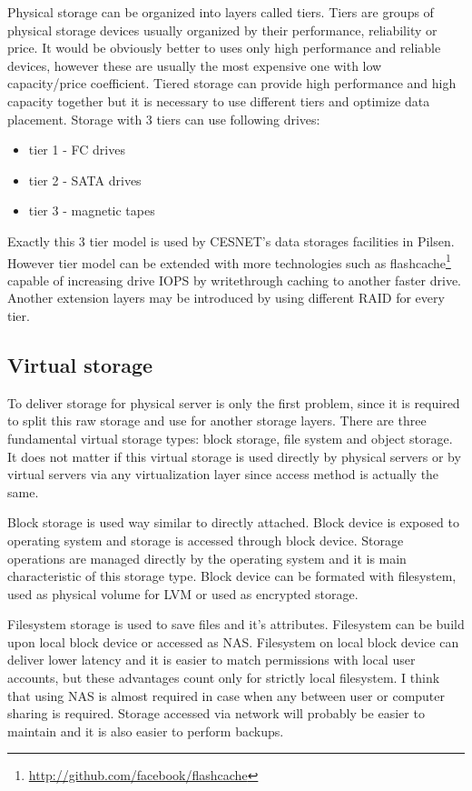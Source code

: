 Physical storage can be organized into layers called tiers. Tiers are groups of physical storage devices usually organized by their performance, reliability or price. It would be obviously better to uses only high performance and reliable devices, however these are usually the most expensive one with low capacity/price coefficient. Tiered storage can provide high performance and high capacity together but it is necessary to use different tiers and optimize data placement. Storage with 3 tiers can use following drives:
\begin{itemize}
	\item tier 1 - \Ac{FC} drives
	\item tier 2 - \Ac{SATA} drives
	\item tier 3 - magnetic tapes
\end{itemize}
Exactly this 3 tier model is used by CESNET's data storages facilities in Pilsen. However tier model can be extended with more technologies such as flashcache\footnote{\url{http://github.com/facebook/flashcache}} capable of increasing drive \Ac{IOPS} by writethrough caching to another faster drive. Another extension layers may be introduced by using different \Ac{RAID} for every tier.


\subsection{Virtual storage}
To deliver storage for physical server is only the first problem, since it is required to split this raw storage and use for another storage layers. There are three fundamental virtual storage types: block storage, file system and object storage. It does not matter if this virtual storage is used directly by physical servers or by virtual servers via any virtualization layer since access method is actually the same.

Block storage is used way similar to directly attached. Block device is exposed to operating system and storage is accessed through block device. Storage operations are managed directly by the operating system and it is main characteristic of this storage type. Block device can be formated with filesystem, used as physical volume for \Ac{LVM} or used as encrypted storage.

Filesystem storage is used to save files and it's attributes. Filesystem can be build upon local block device or accessed as \Ac{NAS}. Filesystem on local block device can deliver lower latency and it is easier to match permissions with local user accounts, but these advantages count only for strictly local filesystem. I think that using \Ac{NAS} is almost required in case when any between user or computer sharing is required. Storage accessed via network will probably be easier to maintain and it is also easier to perform backups. 

